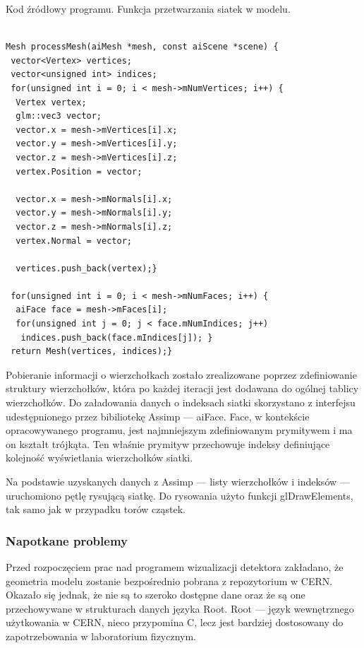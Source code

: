 \begin{table}[H]
\caption{Kod źródłowy programu. Funkcja przetwarzania siatek w modelu.}
\label{tab14}
\begin{lstlisting}[frame=single]  % Start your code-block

Mesh processMesh(aiMesh *mesh, const aiScene *scene) {
 vector<Vertex> vertices;
 vector<unsigned int> indices;
 for(unsigned int i = 0; i < mesh->mNumVertices; i++) {
  Vertex vertex;
  glm::vec3 vector;
  vector.x = mesh->mVertices[i].x;
  vector.y = mesh->mVertices[i].y;
  vector.z = mesh->mVertices[i].z;
  vertex.Position = vector;

  vector.x = mesh->mNormals[i].x;
  vector.y = mesh->mNormals[i].y;
  vector.z = mesh->mNormals[i].z;
  vertex.Normal = vector;
  
  vertices.push_back(vertex);}
  
 for(unsigned int i = 0; i < mesh->mNumFaces; i++) {
  aiFace face = mesh->mFaces[i];
  for(unsigned int j = 0; j < face.mNumIndices; j++)
   indices.push_back(face.mIndices[j]); }
 return Mesh(vertices, indices);}
\end{lstlisting}
\end{table}

Pobieranie informacji o wierzchołkach zostało zrealizowane poprzez zdefiniowanie struktury wierzchołków, która po każdej iteracji jest dodawana do ogólnej tablicy wierzchołków. Do załadowania danych o indeksach siatki skorzystano z interfejsu udestępnionego przez bibiliotekę Assimp --- aiFace. Face, w kontekście opracowywanego programu, jest najmniejszym zdefiniowanym prymitywem i ma on kształt trójkąta. Ten właśnie prymityw przechowuje indeksy definiujące kolejność wyświetlania wierzchołków siatki.

Na podstawie uzyskanych danych z Assimp --- listy wierzchołków i indeksów --- uruchomiono pętlę rysującą siatkę. Do rysowania użyto funkcji glDrawElements, tak samo jak w przypadku torów cząstek.

\subsubsection{Napotkane problemy}
Przed rozpoczęciem prac nad programem wizualizacji detektora zakładano, że geometria modelu zostanie bezpośrednio pobrana z repozytorium w CERN. Okazało się jednak, że nie są to szeroko dostępne dane oraz że są one przechowywane w strukturach danych języka Root. Root --- język wewnętrznego użytkowania w CERN, nieco przypomina C, lecz jest bardziej dostosowany do zapotrzebowania w laboratorium fizycznym.

